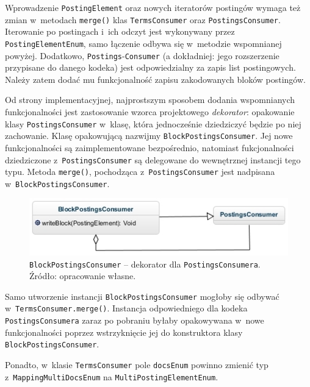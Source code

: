 \begin{enumerate}
\end{enumerate}

Wprowadzenie \texttt{PostingElement} oraz nowych iteratorów postingów wymaga też zmian w~metodach \texttt{merge()} klas \texttt{TermsConsumer} oraz \texttt{PostingsConsumer}. Iterowanie po postingach i~ich odczyt jest wykonywany przez \texttt{PostingElementEnum}, samo łączenie odbywa się w~metodzie wspomnianej powyżej. Dodatkowo, \texttt{Postings}-\texttt{Consumer} (a dokładniej: jego rozszerzenie przypisane do danego kodeka) jest odpowiedzialny za zapis list postingowych. Należy zatem dodać mu funkcjonalność zapisu zakodowanych bloków postingów. 

Od strony implementacyjnej, najprostszym sposobem dodania wspomnianych funkcjonalności jest zastosowanie wzorca projektowego \emph{dekorator}: opakowanie klasy \texttt{PostingsConsumer} w~klasę, która jednocześnie dziedziczyć będzie po niej zachowanie. Klasę opakowującą nazwijmy \texttt{BlockPostingsConsumer}. Jej nowe funkcjonalności są zaimplementowane bezpośrednio, natomiast fukcjonalności dziedziczone z~\texttt{PostingsConsumer} są delegowane do wewnętrznej instancji tego typu. Metoda \texttt{merge()}, pochodząca z~\texttt{PostingsConsumer} jest nadpisana w~\texttt{BlockPostingsConsumer}.

\begin{figure}[here]
 \centering
 \includegraphics[scale=0.8]{pictures/PostingsConsumerWrapper.jpg}
 \caption{\texttt{BlockPostingsConsumer} -- dekorator dla \texttt{PostingsConsumera}. Źródło: opracowanie własne. \label{fig:postingsConsumerWrapper}}
\end{figure}

Samo utworzenie instancji \texttt{BlockPostingsConsumer} mogłoby się odbywać w~\texttt{TermsConsumer.merge()}. Instancja odpowiedniego dla kodeka \texttt{PostingsConsumera} zaraz po pobraniu byłaby opakowywana w~nowe funkcjonalności poprzez wstrzyknięcie jej do konstruktora klasy \texttt{BlockPostingsConsumer}.

Ponadto, w~klasie \texttt{TermsConsumer} pole \texttt{docsEnum} powinno zmienić typ z~\texttt{MappingMultiDocsEnum} na \texttt{MultiPostingElementEnum}.

